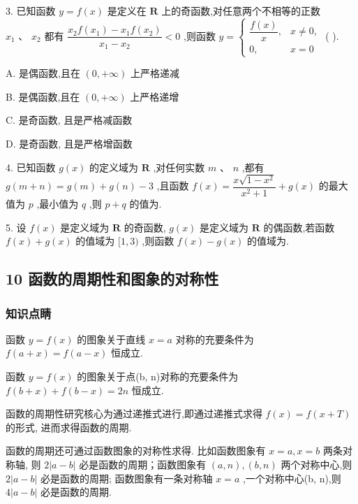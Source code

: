3. 已知函数 $y = f\left( x\right)$ 是定义在 $\mathbf{R}$ 上的奇函数,对任意两个不相等的正数 ${x}_{1}\text{ 、 }{x}_{2}$ 都有 $\dfrac{{x}_{2}f\left( {x}_{1}\right)  - {x}_{1}f\left( {x}_{2}\right) }{{x}_{1} - {x}_{2}} < 0$ ,则函数 $y = \left\{  \begin{array}{ll} \dfrac{f\left( x\right) }{x}, & x \neq  0, \\  0, & x = 0 \end{array}\right.$ (   ).

A. 是偶函数,且在 $\left( {0, + \infty }\right)$ 上严格递减

B. 是偶函数,且在 $\left( {0, + \infty }\right)$ 上严格递增

C. 是奇函数, 且是严格减函数

D. 是奇函数, 且是严格增函数

4. 已知函数 $g\left( x\right)$ 的定义域为 $\mathbf{R}$ ,对任何实数 $m\text{ 、 }n$ ,都有 $g\left( {m + n}\right)  = g\left( m\right)  + g\left( n\right)  - 3$ ,且函数 $f\left( x\right)  = \dfrac{x\sqrt{1 - {x}^{2}}}{{x}^{2} + 1} + g\left( x\right)$ 的最大值为 $p$ ,最小值为 $q$ ,则 $p + q$ 的值为\blkda{}.

5. 设 $f\left( x\right)$ 是定义域为 $\mathbf{R}$ 的奇函数, $g\left( x\right)$ 是定义域为 $\mathbf{R}$ 的偶函数,若函数 $f\left( x\right)  + g\left( x\right)$ 的值域为 $\lbrack 1,3)$ ,则函数 $f\left( x\right)  - g\left( x\right)$ 的值域为\blkda{}.

\subsection*{10 函数的周期性和图象的对称性}

\subsubsection*{知识点睛}

函数 $y = f\left( x\right)$ 的图象关于直线 $x = a$ 对称的充要条件为 $f\left( {a + x}\right)  = f\left( {a - x}\right)$ 恒成立.

函数 $y = f\left( x\right)$ 的图象关于点(b, n)对称的充要条件为 $f\left( {b + x}\right)  + f\left( {b - x}\right)  = {2n}$ 恒成立.

函数的周期性研究核心为通过递推式进行,即通过递推式求得 $f\left( x\right)  = f\left( {x + T}\right)$ 的形式, 进而求得函数的周期.

函数的周期还可通过函数图象的对称性求得. 比如函数图象有 $x = a,x = b$ 两条对称轴, 则 $2\left| {a - b}\right|$ 必是函数的周期；函数图象有 $\left( {a,n}\right) ,\left( {b,n}\right)$ 两个对称中心,则 $2\left| {a - b}\right|$ 必是函数的周期; 函数图象有一条对称轴 $x = a$ ,一个对称中心(b, n),则 $4\left| {a - b}\right|$ 必是函数的周期.

